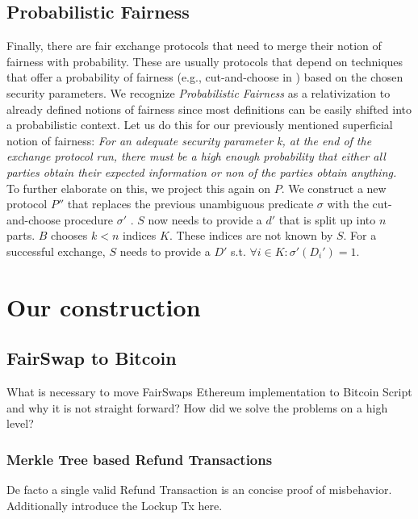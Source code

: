 \documentclass{cacthesis}
\newcounter{protocol}
\begin{document}
        \section{Probabilistic Fairness}
        Finally, there are fair exchange protocols that need to merge their notion of fairness with probability. These are usually protocols that depend on techniques that offer a probability of fairness (e.g., cut-and-choose in \cite{DELGADOSEGURA2020832}) based on the chosen security parameters. We recognize \textit{Probabilistic Fairness} as a relativization to already defined notions of fairness since most definitions can be easily shifted into a probabilistic context. Let us do this for our previously mentioned superficial notion of fairness: \textit{For an adequate security parameter k, at the end of the exchange protocol run, there must be a high enough probability that either all parties obtain their expected information or non of the parties obtain anything.} \\
        To further elaborate on this, we project this again on $P$. We construct a new protocol $P''$ that replaces the previous unambiguous predicate $\sigma$ with the cut-and-choose procedure $\sigma'$ . $S$ now needs to provide a $d'$ that is split up into $n$ parts. $B$ chooses $k < n$ indices $K$. These indices are not known by $S$. For a successful exchange, $S$ needs to provide a $D'$ s.t. $\forall i\in K:\sigma'\left( D_{i}'\right) =1$. \\

        
		
	\chapter{Our construction}
	   
	   \newpage
	   \section{FairSwap to Bitcoin}
        What is necessary to move FairSwaps Ethereum implementation to Bitcoin Script and why it is not straight forward? How did we solve the problems on a high level? 
        
        \subsection{Merkle Tree based Refund Transactions}
        De facto a single valid Refund Transaction is an concise proof of misbehavior. Additionally introduce the Lockup Tx here.
        
\end{document}
